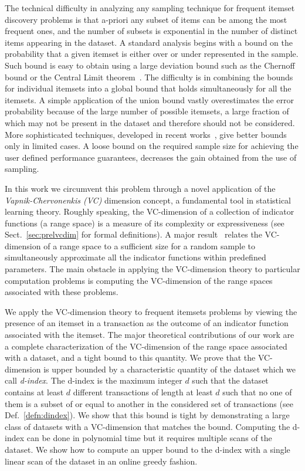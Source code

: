 The technical difficulty in analyzing any sampling technique for frequent
itemset discovery problems is that a-priori any subset of items can be among
the most frequent ones, and the number of subsets is exponential in the number
of distinct items appearing in the dataset. A standard analysis begins with a bound on
the probability that a given itemset is either over or under represented in the
sample. Such bound is easy to obtain using a large deviation bound such as the
Chernoff bound or the Central Limit theorem~\citep{MitzenmacherU05}. The
difficulty is in combining the bounds for individual itemsets
into a global bound that holds simultaneously for all the itemsets. A simple
application of the union bound vastly overestimates the error probability
because of the large number of possible itemsets, a large fraction of which may
not be present in the dataset and therefore should not be considered. More
sophisticated techniques, developed in recent
works~\citep{ChakaravarthyPS09,PietracaprinaRUV10,ChuangCY05}, give better
bounds only in limited cases. A loose bound 
 on the required sample size for achieving the user defined
 performance guarantees, decreases the gain obtained from the use of sampling. 

In this work we circumvent this problem 
through a novel application of the \emph{Vapnik-Chervonenkis (VC)} dimension
concept, a fundamental tool in statistical learning theory.  Roughly speaking,
the VC-dimension of a collection of indicator functions (a range space) is a
measure of its complexity or expressiveness (see Sect.~\ref{sec:prelvcdim} for
formal definitions). A major result~\citep{VapnikC71} relates the VC-dimension of
a range space to a sufficient size for a random sample to simultaneously
approximate all the indicator functions within predefined parameters. The main
obstacle in applying the VC-dimension theory to particular computation problems
is computing the VC-dimension of the range spaces associated with these
problems.  

We apply the VC-dimension theory to frequent itemsets problems by viewing the
presence of an itemset in a transaction as the outcome of an indicator function
associated with the itemset. The major theoretical contributions of our work are
a complete characterization of the VC-dimension of the range space associated
with a dataset, and a tight bound to this quantity. We prove that the VC-dimension
is upper bounded by a
characteristic quantity of the dataset
which we call \emph{d-index}. The d-index is the maximum integer $d$ such that the
dataset contains at least $d$ different transactions of length at least $d$ such
that no one of them is a subset of or equal to another in the considered set
of transactions (see Def.~\ref{defn:dindex}). We show that this bound is tight
by
demonstrating a large class of datasets with a VC-dimension that matches the
bound. Computing the d-index can be done in polynomial time but it requires
multiple scans of the dataset. We show how to compute an upper bound to the
d-index with a single linear scan of the dataset in an online greedy fashion.

